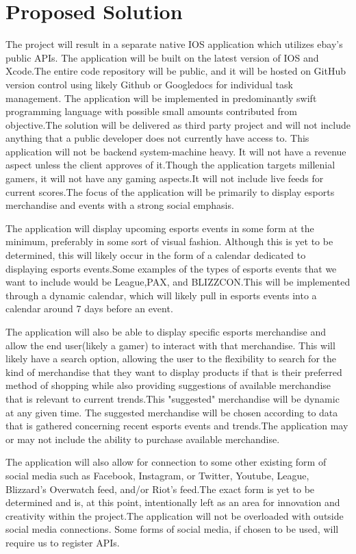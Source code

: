 \documentclass[onecolumn, draftclsnofoot,10pt, compsoc]{IEEEtran}
\begin{document}
\section{Proposed Solution}
\par The project will result in a separate native IOS application which utilizes ebay's public APIs. The application will be built on the latest version of IOS and Xcode.The entire code repository will be public, and it will be hosted on GitHub version control using likely 
Github or Googledocs for individual task management. The application will be implemented in predominantly swift programming language with possible small amounts contributed from objective.The solution will be delivered as third party project and will not include anything that a public developer does not currently have access to. This application will not be backend system-machine heavy. It will not have a revenue aspect unless the client approves of it.Though the application targets millenial gamers, it will not have any gaming aspects.It will not include live feeds for current scores.The focus of the application will be primarily to display esports merchandise and events with a strong social emphasis.
\par The application will display upcoming esports events in some form at the minimum, preferably in some sort of visual fashion. Although this is yet to be determined, this will likely occur in the form of a calendar dedicated to displaying esports events.Some examples of the types of esports events that we want to include would be League,PAX, and BLIZZCON.This will be implemented through a dynamic calendar, which will likely pull in esports events into a calendar around 7 days before an event.
\par The application will also be able to display specific esports merchandise and allow the end user(likely a gamer) to interact with that merchandise. This will likely have a search option, allowing the user to the flexibility to search for the kind of merchandise that they want to display products if that is their preferred method of shopping while also providing suggestions of available merchandise that is relevant to current trends.This "suggested" merchandise will be dynamic at any given time. The suggested merchandise  will be chosen according to data that is gathered concerning recent esports events and trends.The application may or may not include the ability to purchase available merchandise.
\par The application will also allow for connection to some other existing form of social media such as Facebook, Instagram, or Twitter, Youtube, League, Blizzard's Overwatch feed, and/or Riot's feed.The exact form is yet to be determined and is, at this point, intentionally left as an area for innovation and creativity within the project.The application will not be overloaded with outside social media connections. Some forms of social media, if chosen to be used, will require us to register APIs.
\end{document}
